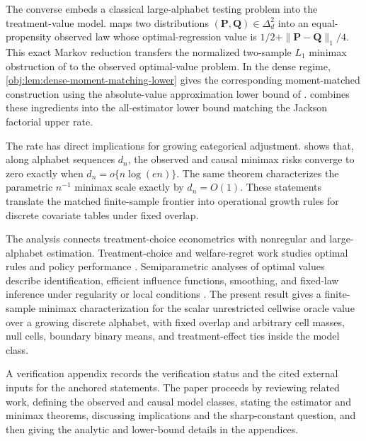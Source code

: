 The converse embeds a classical large-alphabet testing problem into the treatment-value model.  maps two distributions \((\mathbf P,\mathbf Q)\in\Delta_d^2\) into an equal-propensity observed law whose optimal-regression value is \(1/2+\|\mathbf P-\mathbf Q\|_1/4\). This exact Markov reduction transfers the normalized two-sample \(L_1\) minimax obstruction of \citet{JiaoHanWeissman2018L1} to the observed optimal-value problem. In the dense regime, \cref{obj:lem:dense-moment-matching-lower} gives the corresponding moment-matched construction using the absolute-value approximation lower bound of \citet{CaiLow2011L1}.  combines these ingredients into the all-estimator lower bound matching the Jackson factorial upper rate.

The rate has direct implications for growing categorical adjustment.  shows that, along alphabet sequences \(d_n\), the observed and causal minimax risks converge to zero exactly when \(d_n=o\{n\log(en)\}\). The same theorem characterizes the parametric \(n^{-1}\) minimax scale exactly by \(d_n=O(1)\). These statements translate the matched finite-sample frontier into operational growth rules for discrete covariate tables under fixed overlap.

The analysis connects treatment-choice econometrics with nonregular and large-alphabet estimation. Treatment-choice and welfare-regret work studies optimal rules and policy performance \citep{Manski2004,Murphy2003,Hirano2009,Kitagawa2018,Qian2011,Athey2021}. Semiparametric analyses of optimal values describe identification, efficient influence functions, smoothing, and fixed-law inference under regularity or local conditions \citep{Robins1986,Rosenbaum1983,vanDerLaan2015,LuedtkeVanderLaan2016OptimalValue,Chakraborty2010,Hirano2012,Chen2023,WhitehouseChenAusternSyrgkanis2025,Wei2025}. The present result gives a finite-sample minimax characterization for the scalar unrestricted cellwise oracle value over a growing discrete alphabet, with fixed overlap and arbitrary cell masses, null cells, boundary binary means, and treatment-effect ties inside the model class.

A verification appendix records the verification status and the cited external inputs for the anchored statements. The paper proceeds by reviewing related work, defining the observed and causal model classes, stating the estimator and minimax theorems, discussing implications and the sharp-constant question, and then giving the analytic and lower-bound details in the appendices.
